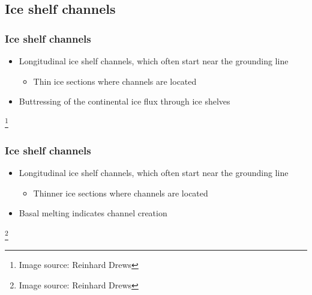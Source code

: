 \documentclass[t, pdftex]{beamer}
\begin{document}
\subsection{Ice shelf channels}
\begin{frame}
	\frametitle{Ice shelf channels}
	\begin{itemize}
		\item Longitudinal ice shelf channels, which often start near the grounding line
		\begin{itemize}
		\item Thin ice sections where channels are located
		\end{itemize} %
		\item Buttressing of the continental ice flux through ice shelves
	\end{itemize}
    \vspace{0.2cm}
      \begin{figure}
    \end{figure}
    \vspace{-.3cm} 
    \let\thefootnote\relax\footnote{Image source: Reinhard Drews}      
\end{frame}


\begin{frame}
	\frametitle{Ice shelf channels}
	\begin{itemize}
		\item Longitudinal ice shelf channels, which often start near the grounding line
		\begin{itemize}
		\item Thinner ice sections where channels are located
		\end{itemize} %
		\item Basal melting indicates channel creation
	\end{itemize}
    \vspace{0.2cm}
      \begin{figure}
    \end{figure}
    \vspace{-.3cm}
    \let\thefootnote\relax\footnote{Image source: Reinhard Drews}        
\end{frame}
 
\end{document}
